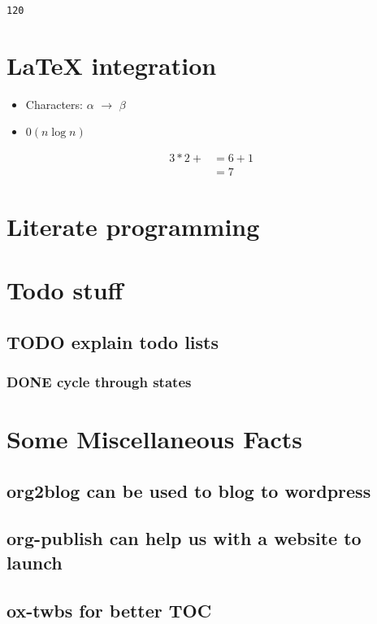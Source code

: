 \documentclass[11pt]{article}
\begin{document}
\begin{verbatim}
120
\end{verbatim}
\section{\LaTeX{} integration}
\label{sec:orgf9f9721}
\begin{itemize}
\item Characters: \(\alpha\) \(\rightarrow\) \(\beta\)
\item \(0(n \log n)\)
\end{itemize}

\begin{align*}
   3 * 2 + &= 6 + 1 \\
           &= 7
\end{align*}

\section{Literate programming}
\label{sec:org9c8d895}

\section{Todo stuff}
\label{sec:orgeb4ce6b}
\subsection{{\bfseries\sffamily TODO} explain todo lists}
\label{sec:org690bc4e}
\subsubsection{{\bfseries\sffamily DONE} cycle through states}
\label{sec:orgc0b9cbe}
\section{Some Miscellaneous Facts}
\label{sec:orgbcdb6ec}
\subsection{org2blog can be used to blog to wordpress}
\label{sec:orgc67b04c}
\subsection{org-publish can help us with a website to launch}
\label{sec:org3e18dad}
\subsection{ox-twbs for better TOC}
\label{sec:orge87f991}
\end{document}
